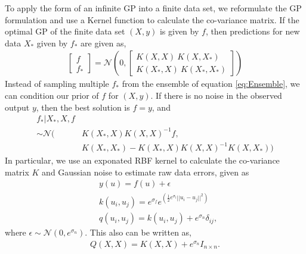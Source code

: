 \documentclass[conference]{IEEEtran}
\begin{document}
To apply the form of an infinite GP into a finite data set, we reformulate the GP formulation and use a Kernel function to calculate the co-variance matrix. 
If the optimal GP of the finite data set $(X,y)$ is given by $f$, then predictions for new data $X_*$ given by $f_*$ are given as,
\begin{equation}
\begin{aligned}
    \begin{bmatrix}
    f\\
    f_*
    \end{bmatrix} = \mathcal{N}\left( 0, \begin{bmatrix}
    K(X,X)\    K(X,X_*)\\
    K(X_*,X)\    K(X_*,X_*)
     \end{bmatrix}    
    \right)
    \label{eq:Ensemble}
\end{aligned}
\end{equation}
Instead of sampling multiple $f_*$ from the ensemble of equation \ref{eq:Ensemble}, we can condition our prior of $f$ for $(X,y)$. 
If there is no noise in the observed output $y$, then the best solution is $f=y$, and
\begin{equation}
\begin{aligned}
    f_*|X_*,X,f & \\
    \sim \mathcal{N} (& K(X_*,X)K(X,X)^{-1}f, \\
    & K(X_*,X_*)- K(X_*,X)K(X,X)^{-1}K(X,X_*)) 
    \label{eq:fstar}
\end{aligned}
\end{equation}
In particular, we use an exponated RBF kernel to calculate the co-variance matrix $K$ and Gaussian noise to estimate raw data errors, given as
\begin{equation}
\begin{aligned}
    &y(u) = f(u) + \epsilon\\
    &k(u_i,u_j) = e^{\sigma_f}e^{\left(\frac{1}{2}e^{\sigma_l}||u_i-u_j||^2\right)} \\
    &q(u_i,u_j) = k(u_i,u_j) + e^{\sigma_n}\delta_{ij},
    \label{eq:Kernel with noise}
\end{aligned}
\end{equation}
where $\epsilon \sim \mathcal{N}(0,e^{\sigma_n}).$
This also can be written as, 
\begin{equation}
\begin{aligned}
Q(X,X) = K(X,X) + e^{\sigma_n}I_{n\times n}.
\end{aligned}
\end{equation}
\end{document}
